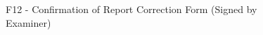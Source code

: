 \begin{figure}[h]
    \centering
    \setlength{\fboxsep}{0pt}
    \caption{F12 - Confirmation of Report Correction Form (Signed by Examiner)}
    \label{fig:myfig87}
\end{figure}
\clearpage
